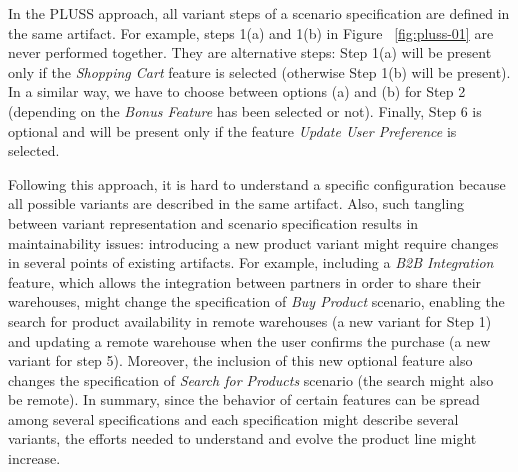 \documentclass{acm_proc_article-sp}
\begin{document}

In the PLUSS approach, all variant steps of a scenario specification are defined in the same artifact. For example, steps 1(a) and 1(b) in Figure ~\ref{fig:pluss-01} are 
never performed together. They are alternative steps: Step 1(a) will be present only if the \emph{Shopping Cart} feature is selected (otherwise Step 1(b) will be present). In a similar way, we have to choose between options (a) and (b) for Step 2 (depending on the \emph{Bonus Feature} has been selected or not). Finally, Step 6 is optional and will be present only if the feature \emph{Update User Preference} is selected. 

Following this approach, it is hard to understand a specific configuration because all possible variants are described in the same artifact. Also, such tangling between variant representation and scenario specification results in maintainability issues: introducing a new product variant might require changes in several points of existing artifacts.  For example, including a \emph{B2B Integration} feature, which allows the integration between partners in order to share their warehouses, might change the specification of \emph{Buy Product} scenario, enabling the search for product availability in remote warehouses (a new variant for Step 1) and updating a remote warehouse when the user confirms the purchase (a new variant for step 5). Moreover, the inclusion of this new optional feature also changes the specification of \emph{Search for Products} scenario (the search might also be remote). In summary, since the behavior of certain features can be spread among several specifications and each specification might describe several variants, the efforts needed to understand and evolve the product line might increase.    
\end{document}
